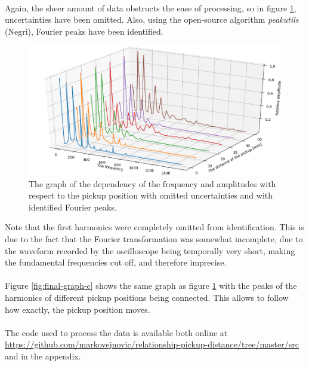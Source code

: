 \documentclass{article}
\begin{document}
\paragraph*{}
Again, the sheer amount of data obstructs the ease of processing, so in figure 
\ref{fig:final-graph}, uncertainties have been omitted. Also, using the 
open-source algorithm \textit{peakutils} (Negri), Fourier peaks have been 
identified.
\begin{figure}[ht]
	\centering
	\includegraphics[width=\textwidth]{img/final-graph}
	\caption{The graph of the dependency of the frequency and amplitudes with 
	respect to the pickup position with omitted uncertainties and with 
identified Fourier peaks.}
	\label{fig:final-graph}
\end{figure}
Note that the first harmonics were completely omitted from identification. 
This is due to the fact that the Fourier transformation was somewhat 
incomplete, due to the waveform recorded by the oscilloscope being temporally 
very short, making the fundamental frequencies cut off, and therefore 
imprecise.

\paragraph*{}
Figure \ref{fig:final-graph-c} shows the same graph as figure 
\ref{fig:final-graph} with the peaks of the harmonics of different pickup 
positions being connected. This allows to follow how exactly, the pickup 
position moves.

\paragraph*{}
The code used to process the data is available both online at 
\url{https://github.com/markovejnovic/relationship-pickup-distance/tree/master/src} 
and in the appendix.
\end{document}
